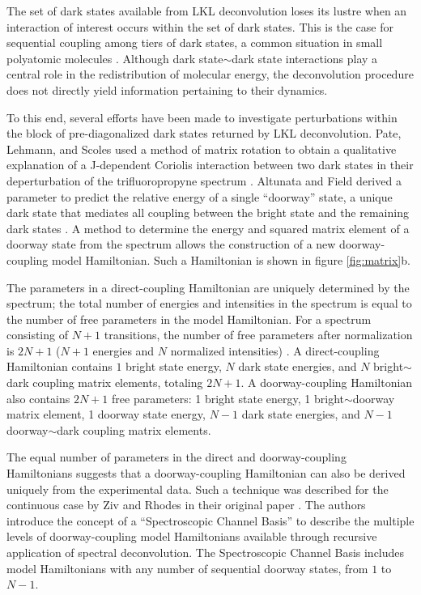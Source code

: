The set of dark states available from LKL deconvolution loses its
lustre when an interaction of interest occurs within the set of dark
states.  This is the case for sequential coupling among tiers of dark
states, a common situation in small polyatomic molecules
\cite{tramer05}.  Although dark state$\sim$dark state interactions
play a central role in the redistribution of molecular energy, the
deconvolution procedure does not directly yield information pertaining
to their dynamics.

To this end, several efforts have been made to investigate
perturbations within the block of pre-diagonalized dark states
returned by LKL deconvolution.  Pate, Lehmann, and Scoles used a
method of matrix rotation to obtain a qualitative explanation of a
J-dependent Coriolis interaction between two dark states in their
deperturbation of the trifluoropropyne spectrum \cite{pate91}.
Altunata and Field derived a parameter to predict the relative energy
of a single ``doorway'' state, a unique dark state that mediates all
coupling between the bright state and the remaining dark states
\cite{altunata01}.  A method to determine the energy and squared
matrix element of a doorway state from the spectrum allows the
construction of a new doorway-coupling model Hamiltonian.  Such a
Hamiltonian is shown in figure \ref{fig:matrix}b.

The parameters in a direct-coupling Hamiltonian are uniquely
determined by the spectrum; the total number of energies and
intensities in the spectrum is equal to the number of free parameters
in the model Hamiltonian.  For a spectrum consisting of $N+1$
transitions, the number of free parameters after normalization is
$2N+1$ ($N+1$ energies and $N$ normalized intensities)
\cite{lawrance85}.  A direct-coupling Hamiltonian contains $1$ bright
state energy, $N$ dark state energies, and $N$ bright$\sim$dark
coupling matrix elements, totaling $2N+1$.  A doorway-coupling
Hamiltonian also contains $2N+1$ free parameters: 1 bright state
energy, 1 bright$\sim$doorway matrix element, 1 doorway state energy,
$N-1$ dark state energies, and $N-1$ doorway$\sim$dark coupling matrix
elements.

The equal number of parameters in the direct and doorway-coupling
Hamiltonians suggests that a doorway-coupling Hamiltonian can also be
derived uniquely from the experimental data.  Such a technique was
described for the continuous case by Ziv and Rhodes in their original
paper \cite{ziv76}.  The authors introduce the concept of a
``Spectroscopic Channel Basis'' to describe the multiple levels of
doorway-coupling model Hamiltonians available through recursive
application of spectral deconvolution.  The Spectroscopic Channel
Basis includes model Hamiltonians with any number of sequential
doorway states, from $1$ to $N-1$.

